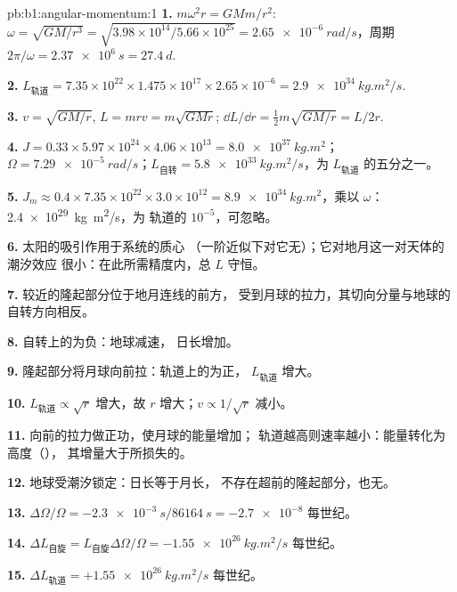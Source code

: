 \begin{solution}{pb:b1:angular-momentum:1}
\textbf{1.} $m\omega^2r = GMm/r^2$: $\omega = \sqrt{GM/r^3} = \sqrt{3.98\times
10^{14}/5.66\times10^{25}} = \qty{2.65e-6}{rad/s}$，周期 $2\pi/\omega =
\qty{2.37e6}{s} = \qty{27.4}{d}$.

\textbf{2.} $L_{\text{轨道}} = 7.35\times10^{22} \times 1.475\times10^{17}
\times 2.65\times10^{-6} = \qty{2.9e34}{kg.m^2/s}$.

\textbf{3.} $v = \sqrt{GM/r}$, $L = mrv = m\sqrt{GMr}$; $\dd L/\dd r =
\tfrac12 m\sqrt{GM/r} = L/2r$.

\textbf{4.} $J = 0.33 \times 5.97\times10^{24} \times 4.06\times10^{13} =
\qty{8.0e37}{kg.m^2}$；$\Omega = \qty{7.29e-5}{rad/s}$；$L_{\text{自转}} =
\qty{5.8e33}{kg.m^2/s}$，为 $L_{\text{轨道}}$ 的五分之一。

\textbf{5.} $J_m \approx 0.4 \times 7.35\times10^{22} \times 3.0\times10^{12} =
\qty{8.9e34}{kg.m^2}$，乘以 $\omega$：\qty{2.4e29}{kg.m^2/s}，为
轨道的 $10^{-5}$，可忽略。

\textbf{6.} 太阳的吸引作用于系统的质心
（一阶近似下对它无）；它对地月这一对天体的潮汐效应
很小：在此所需精度内，总 $L$ 守恒。

\textbf{7.} 较近的隆起部分位于地月连线的前方，
受到月球的拉力，其切向分量与地球的
自转方向相反。

\textbf{8.} 自转上的为负：地球减速，
日长增加。

\textbf{9.} 隆起部分将月球向前拉：轨道上的为正，
$L_{\text{轨道}}$ 增大。

\textbf{10.} $L_{\text{轨道}} \propto \sqrt r$ 增大，故 $r$ 增大；$v \propto
1/\sqrt r$ 减小。

\textbf{11.} 向前的拉力做正功，使月球的能量增加；
轨道越高则速率越小：能量转化为高度（），
其增量大于所损失的。

\textbf{12.} 地球受潮汐锁定：日长等于月长，
不存在超前的隆起部分，也无。

\textbf{13.} $\Delta\Omega/\Omega = -\qty{2.3e-3}{s}/\qty{86164}{s} =
\num{-2.7e-8}$ 每世纪。

\textbf{14.} $\Delta L_{\text{自旋}} = L_{\text{自旋}}\Delta\Omega/\Omega =
\qty{-1.55e26}{kg.m^2/s}$ 每世纪。

\textbf{15.} $\Delta L_{\text{轨道}} = +\qty{1.55e26}{kg.m^2/s}$ 每世纪。


\end{solution}
